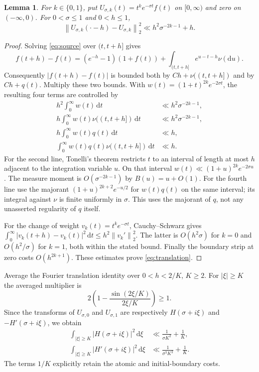 \documentclass[11pt,letterpaper]{article}
\numberwithin{equation}{section}
\newtheorem{lemma}[theorem]{Lemma}
\theoremstyle{definition}
\theoremstyle{remark}
\newcommand{\dd}{\,\mathrm d}
\newcommand{\norm}[1]{\left\lVert#1\right\rVert}
\begin{document}
\begin{lemma}\label{lem:translations}
For $k\in\{0,1\}$, put $U_{\sigma,k}(t)=t^ke^{-\sigma t}f(t)$ on
$[0,\infty)$ and zero on $(-\infty,0)$. For $0<\sigma\le1$ and $0<h\le1$,
\begin{equation}\label{eq:translation}
 \norm{U_{\sigma,k}(\cdot-h)-U_{\sigma,k}}_2^2
 \ll h^2\sigma^{-2k-1}+h.
\end{equation}
\end{lemma}
\begin{proof}
Solving \eqref{eq:source} over $(t,t+h]$ gives
\[
 f(t+h)-f(t)=(e^{-h}-1)(1+f(t))
       +\int_{(t,t+h]}e^{u-t-h}\nu(\mathrm du).
\]
Consequently $|f(t+h)-f(t)|$ is bounded both by
$Ch+\nu((t,t+h])$ and by $Ch+q(t)$. Multiply these two bounds.
With $w(t)=(1+t)^{2k}e^{-2\sigma t}$, the resulting four terms are controlled
by
\begin{align*}
 h^2\int_0^\infty w(t)\dd t&\ll h^2\sigma^{-2k-1},\\
 h\int_0^\infty w(t)\nu((t,t+h])\dd t&\ll h^2\sigma^{-2k-1},\\
 h\int_0^\infty w(t)q(t)\dd t&\ll h,\\
 \int_0^\infty w(t)q(t)\nu((t,t+h])\dd t&\ll h.
\end{align*}
For the second line, Tonelli's theorem restricts $t$ to an interval of
length at most $h$ adjacent to the integration variable $u$. On that
interval $w(t)\ll(1+u)^{2k}e^{-2\sigma u}$. The measure moment is
$O(\sigma^{-2k-1})$ by $B(u)=u+O(1)$. For the fourth line use the
majorant $(1+u)^{2k+2}e^{-u/2}$ for $w(t)q(t)$ on the same interval;
its integral against $\nu$ is finite uniformly in $\sigma$. This uses the
majorant of $q$, not any unasserted regularity of $q$ itself.

For the change of weight $v_k(t)=t^ke^{-\sigma t}$, Cauchy--Schwarz gives
$\int_0^\infty|v_k(t+h)-v_k(t)|^2\dd t\le h^2\norm{v_k'}_2^2$.
The latter is $O(h^2\sigma)$ for $k=0$ and $O(h^2/\sigma)$ for $k=1$,
both within the stated bound. Finally the boundary strip at zero costs
$O(h^{2k+1})$. These estimates prove \eqref{eq:translation}.
\end{proof}

Average the Fourier translation identity over $0<h<2/K$, $K\ge2$.
For $|\xi|\ge K$ the averaged multiplier is
\[
 2\left(1-\frac{\sin(2\xi/K)}{2\xi/K}\right)\ge1.
\]
Since the transforms of $U_{\sigma,0}$ and $U_{\sigma,1}$ are respectively
$H(\sigma+i\xi)$ and $-H'(\sigma+i\xi)$, we obtain
\begin{align}
 \int_{|\xi|\ge K}|H(\sigma+i\xi)|^2\dd\xi
   &\ll\frac1{\sigma K^2}+\frac1K,\label{eq:tail-H}\\
 \int_{|\xi|\ge K}|H'(\sigma+i\xi)|^2\dd\xi
   &\ll\frac1{\sigma^3K^2}+\frac1K.\label{eq:tail-Hprime}
\end{align}
The terms $1/K$ explicitly retain the atomic and initial-boundary costs.
\end{document}
